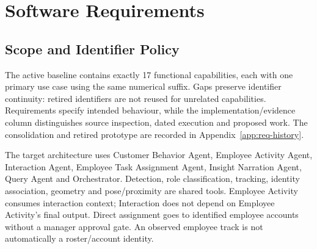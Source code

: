 \chapter{Software Requirements}
\label{ch:req}
\section{Scope and Identifier Policy}
The active baseline contains exactly 17 functional capabilities, each with one primary use case using the same numerical suffix. Gaps preserve identifier continuity: retired identifiers are not reused for unrelated capabilities. Requirements specify intended behaviour, while the implementation/evidence column distinguishes source inspection, dated execution and proposed work. The consolidation and retired prototype are recorded in Appendix~\ref{app:req-history}.

The target architecture uses Customer Behavior Agent, Employee Activity Agent, Interaction Agent, Employee Task Assignment Agent, Insight Narration Agent, Query Agent and Orchestrator. Detection, role classification, tracking, identity association, geometry and pose/proximity are shared tools. Employee Activity consumes interaction context; Interaction does not depend on Employee Activity's final output. Direct assignment goes to identified employee accounts without a manager approval gate. An observed employee track is not automatically a roster/account identity.

